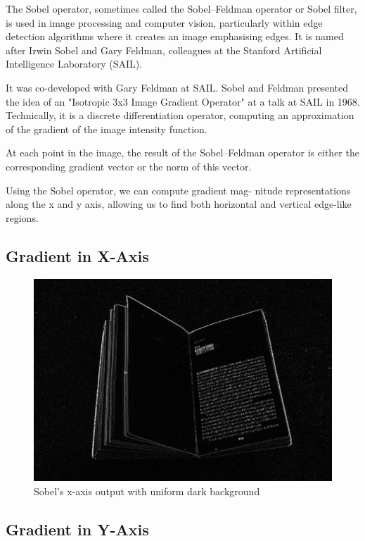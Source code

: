 \documentclass[BTech]{srmuthesis}
\begin{document}
The Sobel operator, sometimes called the Sobel–Feldman operator or Sobel filter, is used in image processing and computer vision, particularly within edge detection algorithms where it creates an image emphasising edges. It is named after Irwin Sobel and Gary Feldman, colleagues at the Stanford Artificial Intelligence Laboratory (SAIL). 

It was co-developed with Gary Feldman at SAIL. Sobel and Feldman presented the idea of an "Isotropic 3x3 Image Gradient Operator" at a talk at SAIL in 1968. Technically, it is a discrete differentiation operator, computing an approximation of the gradient of the image intensity function.

At each point in the image, the result of the Sobel–Feldman operator is either the corresponding gradient vector or the norm of this vector. 

Using the Sobel operator, we can compute gradient mag-
nitude representations along the x and y axis, allowing us to find both horizontal and vertical edge-like regions.

\subsection{Gradient in X-Axis}

\begin{figure}[h!]
    \centering
    \includegraphics[width=13.5cm\textwidth]{sobelx_640x480}
    \caption{Sobel's x-axis output with uniform dark background}
    \label{fig:Sobel's x-axis output with uniform dark background}
\end{figure}

\subsection{Gradient in Y-Axis}
\end{document}
